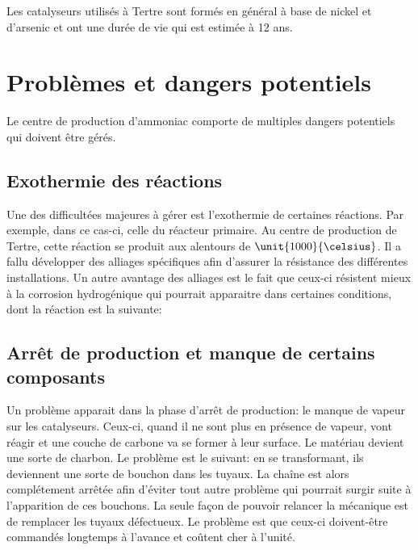 Les catalyseurs utilisés à Tertre sont formés en général à base de nickel et d'arsenic et ont une durée de vie qui est estimée à 12 ans.

\section*{Problèmes et dangers potentiels}
Le centre de production d'ammoniac comporte de multiples dangers potentiels qui doivent être gérés. 

\subsection*{Exothermie des réactions}
Une des difficultées majeures à gérer est l'exothermie de certaines réactions. Par exemple, dans ce cas-ci, celle du réacteur primaire. Au centre de production de Tertre, cette réaction se produit aux alentours de $\unit{1000}{\celsius}$. Il a fallu développer des alliages spécifiques afin d'assurer la résistance des différentes installations. Un autre avantage des alliages est le fait que ceux-ci résistent mieux à la corrosion hydrogénique qui pourrait apparaitre dans certaines conditions, dont la réaction est la suivante:


\subsection*{Arrêt de production et manque de certains composants}
Un problème apparait dans la phase d'arrêt de production: le manque de vapeur sur les catalyseurs. Ceux-ci, quand il ne sont plus en présence de vapeur, vont réagir et une couche de carbone va se former à leur surface. Le matériau devient une sorte de charbon. Le problème est le suivant: en se transformant, ils deviennent une sorte de bouchon dans les tuyaux. La chaîne est alors complétement arrêtée afin d'éviter tout autre problème qui pourrait surgir suite à l'apparition de ces bouchons. La seule façon de pouvoir relancer la mécanique est de remplacer les tuyaux défectueux. Le problème est que ceux-ci doivent-être commandés longtemps à l'avance et coûtent cher à l'unité.

